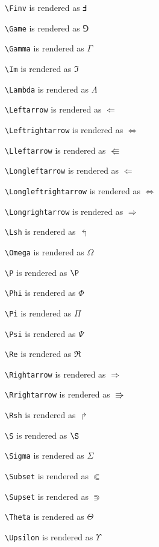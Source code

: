 \texttt{\textbackslash Finv} is rendered as $\Finv$

\texttt{\textbackslash Game} is rendered as $\Game$

\texttt{\textbackslash Gamma} is rendered as $\Gamma$

\texttt{\textbackslash Im} is rendered as $\Im$

\texttt{\textbackslash Lambda} is rendered as $\Lambda$

\texttt{\textbackslash Leftarrow} is rendered as $\Leftarrow$

\texttt{\textbackslash Leftrightarrow} is rendered as $\Leftrightarrow$

\texttt{\textbackslash Lleftarrow} is rendered as $\Lleftarrow$

\texttt{\textbackslash Longleftarrow} is rendered as $\Longleftarrow$

\texttt{\textbackslash Longleftrightarrow} is rendered as $\Longleftrightarrow$

\texttt{\textbackslash Longrightarrow} is rendered as $\Longrightarrow$

\texttt{\textbackslash Lsh} is rendered as $\Lsh$

\texttt{\textbackslash Omega} is rendered as $\Omega$

\texttt{\textbackslash P} is rendered as $\P$

\texttt{\textbackslash Phi} is rendered as $\Phi$

\texttt{\textbackslash Pi} is rendered as $\Pi$

\texttt{\textbackslash Psi} is rendered as $\Psi$

\texttt{\textbackslash Re} is rendered as $\Re$

\texttt{\textbackslash Rightarrow} is rendered as $\Rightarrow$

\texttt{\textbackslash Rrightarrow} is rendered as $\Rrightarrow$

\texttt{\textbackslash Rsh} is rendered as $\Rsh$

\texttt{\textbackslash S} is rendered as $\S$

\texttt{\textbackslash Sigma} is rendered as $\Sigma$

\texttt{\textbackslash Subset} is rendered as $\Subset$

\texttt{\textbackslash Supset} is rendered as $\Supset$

\texttt{\textbackslash Theta} is rendered as $\Theta$

\texttt{\textbackslash Upsilon} is rendered as $\Upsilon$

